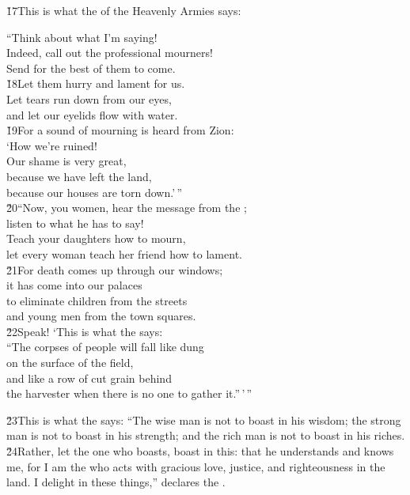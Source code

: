 \v{17}This is what the  of the Heavenly Armies says:

\begin{poetry}
\poeml ``Think about what I'm saying! \\
\poemll    Indeed, call out the professional mourners! \\
\poemlll       Send for the best of them to come. \\
\poeml \v{18}Let them hurry and lament for us. \\
\poemll    Let tears run down from our eyes, \\
\poemlll       and let our eyelids flow with water. \\
\poeml \v{19}For a sound of mourning is heard from Zion: \\
\poemll    `How we're ruined! \\
\poeml Our shame is very great, \\
\poemll    because we have left the land, \\
\poemlll       because our houses are torn down.'\,'' \\
\poeml \v{20}``Now, you women, hear the message from the ; \\
\poemll    listen to what he has to say! \\
\poeml Teach your daughters how to mourn, \\
\poemll    let every woman teach her friend how to lament. \\
\poeml \v{21}For death comes up through our windows; \\
\poemll    it has come into our palaces \\
\poeml to eliminate children from the streets \\
\poemll    and young men from the town squares. \\
\poeml \v{22}Speak! `This is what the  says: \\
\poeml ``The corpses of people will fall like dung \\
\poemll    on the surface of the field, \\
\poeml and like a row of cut grain behind \\
\poemll    the harvester when there is no one to gather it.''\,'\,''
\end{poetry}

\v{23}This is what the  says: ``The wise man is not to boast in his wisdom; the strong man is not to boast in his strength; and the rich man is not to boast in his riches. \v{24}Rather, let the one who boasts, boast in this: that he understands and knows me, for I am the  who acts with gracious love, justice, and righteousness in the land. I delight in these things,'' declares the .

